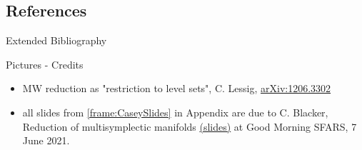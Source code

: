 \documentclass[beamer,handout,10pt]{standalone}
\begin{document}


\subsection{References}

\begin{frame}[t,allowframebreaks]{Extended Bibliography}
	
	
\end{frame}





\begin{frame}[t,allowframebreaks]{Pictures - Credits}
	\begin{itemize}
		\item MW reduction as "restriction to level sets", C. Lessig,
			\href{https://arxiv.org/abs/1206.3302}{arXiv:1206.3302}
		\item all slides from \ref{frame:CaseySlides} in Appendix are due to C. Blacker, Reduction of multisymplectic manifolds \href{https://public.eimi.ru/~cblacker/Blacker.reduction\%20of\%20multisymplectic\%20manifolds.pdf}{(slides)} 
	at Good Morning SFARS, 7 June 2021.
	\end{itemize}
\end{frame}



\end{document}
